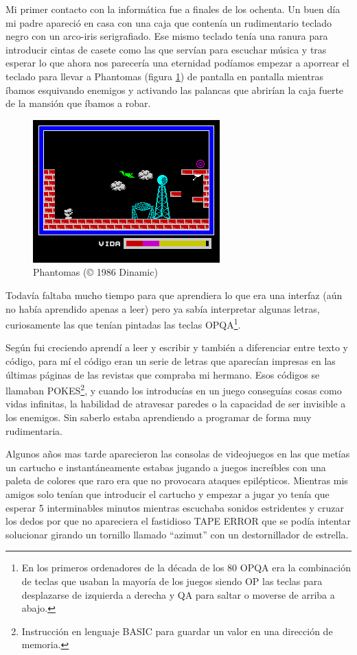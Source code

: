 Mi primer contacto con la informática fue a finales de los ochenta. Un buen día mi padre apareció en casa con una caja que contenía un rudimentario teclado negro con un arco-iris serigrafiado. Ese mismo teclado tenía una ranura para introducir cintas de casete como las que servían para escuchar música y tras esperar lo que ahora nos parecería una eternidad podíamos empezar a aporrear el teclado para llevar a Phantomas (figura \ref{fig:phantomas}) de pantalla en pantalla mientras íbamos esquivando enemigos y activando las palancas que abrirían la caja fuerte de la mansión que íbamos a robar.


\begin{figure}[h!]
\centering
\includegraphics{../images/phantomas-sp1}
\caption{Phantomas (© 1986 Dinamic)}
\label{fig:phantomas}
\end{figure}

\bigskip
Todavía faltaba mucho tiempo para que aprendiera lo que era una interfaz (aún no había aprendido apenas a leer) pero ya sabía interpretar algunas letras, curiosamente las que tenían pintadas las teclas OPQA\footnote{En los primeros ordenadores de la década de los 80 OPQA era la combinación de teclas que usaban la mayoría de los juegos siendo OP las teclas para desplazarse de izquierda a derecha y QA para saltar o moverse de arriba a abajo.}.

\bigskip
Según fui creciendo aprendí a leer y escribir y también a diferenciar entre texto y código, para mí el código eran un serie de letras que aparecían impresas en las últimas páginas de las revistas que compraba mi hermano. Esos códigos se llamaban POKES\footnote{Instrucción en lenguaje BASIC para guardar un valor en una dirección de memoria.}, y cuando los introducías en un juego conseguías cosas como vidas infinitas, la habilidad de atravesar paredes o la capacidad de ser invisible a los enemigos. Sin saberlo estaba aprendiendo a programar de forma muy rudimentaria.

\bigskip
Algunos años mas tarde aparecieron las consolas de videojuegos en las que metías un cartucho e instantáneamente estabas jugando a juegos increíbles con una paleta de colores que raro era que no provocara ataques epilépticos. Mientras mis amigos solo tenían que introducir el cartucho y empezar a jugar yo tenía que esperar 5 interminables minutos mientras escuchaba sonidos estridentes y cruzar los dedos por que no apareciera el fastidioso TAPE ERROR que se podía intentar solucionar girando un tornillo llamado ``azimut'' con un destornillador de estrella.

